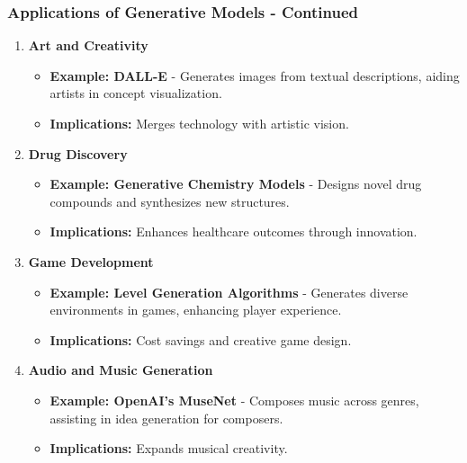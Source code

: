 \documentclass[aspectratio=169]{beamer}
\begin{document}
\begin{frame}[fragile]
    \frametitle{Applications of Generative Models - Continued}
    \begin{enumerate}[start=3]
        \item \textbf{Art and Creativity}
            \begin{itemize}
                \item \textbf{Example: DALL-E} - Generates images from textual descriptions, aiding artists in concept visualization.
                \item \textbf{Implications:} Merges technology with artistic vision.
            \end{itemize}

        \item \textbf{Drug Discovery}
            \begin{itemize}
                \item \textbf{Example: Generative Chemistry Models} - Designs novel drug compounds and synthesizes new structures.
                \item \textbf{Implications:} Enhances healthcare outcomes through innovation.
            \end{itemize}

        \item \textbf{Game Development}
            \begin{itemize}
                \item \textbf{Example: Level Generation Algorithms} - Generates diverse environments in games, enhancing player experience.
                \item \textbf{Implications:} Cost savings and creative game design.
            \end{itemize}

        \item \textbf{Audio and Music Generation}
            \begin{itemize}
                \item \textbf{Example: OpenAI's MuseNet} - Composes music across genres, assisting in idea generation for composers.
                \item \textbf{Implications:} Expands musical creativity.
            \end{itemize}
    \end{enumerate}
\end{frame}
\end{document}

